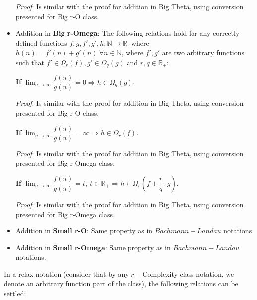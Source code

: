 \begin{itemize}
  \textit{Proof}:
Is similar with the proof for addition in Big Theta, using conversion presented for Big r-O class.
\hfill\break


  \item Addition in \textbf{Big r-Omega}: 
  The following relations hold for any correctly defined functions $f, g, f', g', h:\mathbb{N}\longrightarrow\mathbb{R}$, where $ h(n) = f'(n) + g'(n)\  \forall n \in \mathbb{N} $, where $f',g'$ are two arbitrary functions such that $ f' \in \Omega_{r}(f),  g' \in \Omega_{q}(g) $ and $r,q \in \mathbb{R}_{+}$:  
\begin{theorem} 
    \textbf{If} $ \lim_{n\to\infty} \dfrac{f(n)}{g(n)} = 0 \Rightarrow  h \in \Omega_{q}(g) $. \\
\end{theorem} 
\textit{Proof}:
Is similar with the proof for addition in Big Theta, using conversion presented for Big r-O class.
\hfill\break

\begin{theorem} 
  \textbf{If} $ \lim_{n\to\infty} \dfrac{f(n)}{g(n)} = \infty \Rightarrow  h \in \Omega_{r}(f) $. \\
\end{theorem} 
  \textit{Proof}:
Is similar with the proof for addition in Big Theta, using conversion presented for Big r-Omega class.
\hfill\break
\begin{theorem} 
  \textbf{If} $ \lim_{n\to\infty} \dfrac{f(n)}{g(n)} = t, \ t \in \mathbb{R}_{+} \Rightarrow  h \in \Omega_{r} \left( f + \dfrac{r}{q} \cdot g \right) $. \\
\end{theorem} 
  \textit{Proof}:
Is similar with the proof for addition in Big Theta, using conversion presented for Big r-Omega class.
\hfill\break

  \item Addition in \textbf{Small r-O}:
  Same property as in $Bachmann-Landau$ notations.
  \item Addition in \textbf{Small r-Omega}:
  Same property as in $Bachmann-Landau$ notations.
\end{itemize}


In a relax notation (consider that by any  $r-$Complexity class notation, we denote an arbitrary function part of the class), the following relations can be settled:


